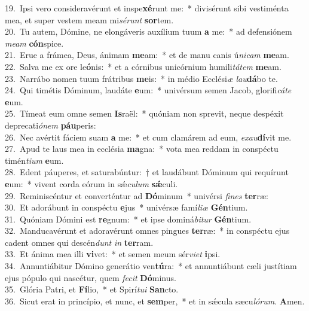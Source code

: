 {19.~}Ipsi vero consideravérunt et inspe\textbf{xé}runt me:~* divisérunt sibi vestiménta mea, et super vestem meam mi\textit{sé}\textit{runt} \textbf{sor}tem.\\
{20.~}Tu autem, Dómine, ne elongáveris auxílium tuum \textbf{a} me:~* ad defensiónem \textit{me}\textit{am} \textbf{cón}spice.\\
{21.~}Erue a frámea, Deus, ánimam \textbf{me}am:~* et de manu canis ú\textit{ni}\textit{cam} \textbf{me}am.\\
{22.~}Salva me ex ore le\textbf{ó}nis:~* et a córnibus unicórnium humili\textit{tá}\textit{tem} \textbf{me}am.\\
{23.~}Narrábo nomen tuum frátribus \textbf{me}is:~* in médio Ecclési\textit{æ} \textit{lau}\textbf{dá}bo te.\\
{24.~}Qui timétis Dóminum, laudáte \textbf{e}um:~* univérsum semen Jacob, glorifi\textit{cá}\textit{te} \textbf{e}um.\\
{25.~}Tímeat eum omne semen \textbf{Is}raël:~* quóniam non sprevit, neque despéxit deprecati\textit{ó}\textit{nem} \textbf{páu}peris:\\
{26.~}Nec avértit fáciem suam \textbf{a} me:~* et cum clamárem ad eum, \textit{e}\textit{xau}\textbf{dí}vit me.\\
{27.~}Apud te laus mea in ecclésia \textbf{ma}gna:~* vota mea reddam in conspéctu timén\textit{ti}\textit{um} \textbf{e}um.\\
{28.~}Edent páuperes, et saturabúntur:~† et laudábunt Dóminum qui requírunt \textbf{e}um:~* vivent corda eórum in sǽ\textit{cu}\textit{lum} \textbf{sǽ}culi.\\
{29.~}Reminiscéntur et converténtur ad \textbf{Dó}minum~* univérsi \textit{fi}\textit{nes} \textbf{ter}ræ:\\
{30.~}Et adorábunt in conspéctu \textbf{e}jus~* univérsæ famí\textit{li}\textit{æ} \textbf{Gén}tium.\\
{31.~}Quóniam Dómini est \textbf{re}gnum:~* et ipse dominá\textit{bi}\textit{tur} \textbf{Gén}tium.\\
{32.~}Manducavérunt et adoravérunt omnes pingues \textbf{ter}ræ:~* in conspéctu ejus cadent omnes qui descén\textit{dunt} \textit{in} \textbf{ter}ram.\\
{33.~}Et ánima mea illi \textbf{vi}vet:~* et semen meum sér\textit{vi}\textit{et} \textbf{i}psi.\\
{34.~}Annuntiábitur Dómino generátio ven\textbf{tú}ra:~* et annuntiábunt cæli justítiam ejus pópulo qui nascétur, quem \textit{fe}\textit{cit} \textbf{Dó}minus.\\
{35.~}Glória Patri, et \textbf{Fí}lio,~* et Spirí\textit{tu}\textit{i} \textbf{San}cto.\\
{36.~}Sicut erat in princípio, et nunc, et \textbf{sem}per,~* et in sǽcula sæcu\textit{ló}\textit{rum}. \textbf{A}men.\\
